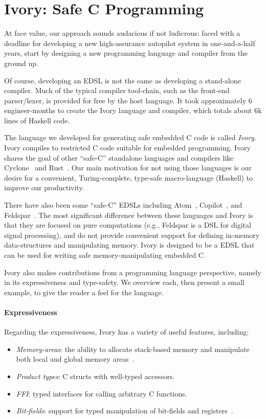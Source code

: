\section{Ivory: Safe C Programming}
\label{sec:ivory}

At face value, our approach sounds audacious if not ludicrous: faced with a
deadline for developing a new high-assurance autopilot system in one-and-a-half
years, start by designing a new programming language and compiler from the
ground up.

Of course, developing an EDSL is not the same as developing a stand-alone
compiler.  Much of the typical compiler tool-chain, such as the front-end
parser/lexer, is provided for free by the host language.  It took approximately
6 engineer-months to create the Ivory language and compiler, which totals about
6k lines of Haskell code.

The language we developed for generating safe embedded C code is called
\emph{Ivory}.  Ivory compiles to restricted C code suitable for embedded
programming.  Ivory shares the goal of other ``safe-C'' standalone languages and
compilers like Cyclone~\cite{cyclone} and Rust~\cite{rust}.  Our main motivation
for not using those languages is our desire for a convenient, Turing-complete,
type-safe macro-language (Haskell) to improve our productivity.

There have also been some ``safe-C'' EDSLs including Atom~\cite{atom},
Copilot~\cite{copilot}, and Feldspar~\cite{feldspar1}.  The most significant
difference between these languages and Ivory is that they are focused on pure
computations (e.g., Feldspar is a DSL for digital signal processing), and do not
provide convenient support for defining in-memory data-structures and
manipulating memory.  Ivory is designed to be a EDSL that can be used for
writing safe memory-manipulating embedded C.

Ivory also makes  contributions from a programming language
perspective, namely in its expressiveness and type-safety.  We overview each,
then present a small example, to give the reader a feel for the language.

\paragraph{Expressiveness}
Regarding the expressiveness, Ivory has a variety of useful features, including:
\begin{itemize}
  \item \emph{Memory-areas}: the ability to allocate stack-based memory and
    manipulate both local and global memory areas~\cite{memareas}.
  \item \emph{Product types}: C structs with well-typed accessors.
  \item \emph{FFI}: typed interfaces for calling arbitrary C functions.
  \item \emph{Bit-fields}: support for typed manipulation of bit-fields and
    registers~\cite{high-level}.
\end{itemize}

